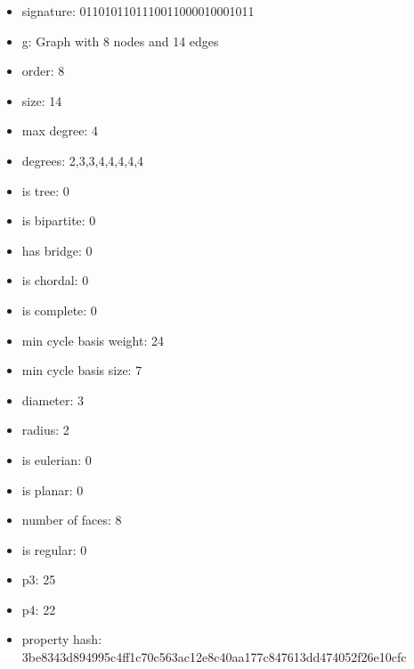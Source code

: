 \begin{itemize}
\item signature: 0110101101110011000010001011
\item g: Graph with 8 nodes and 14 edges
\item order: 8
\item size: 14
\item max degree: 4
\item degrees: 2,3,3,4,4,4,4,4
\item is tree: 0
\item is bipartite: 0
\item has bridge: 0
\item is chordal: 0
\item is complete: 0
\item min cycle basis weight: 24
\item min cycle basis size: 7
\item diameter: 3
\item radius: 2
\item is eulerian: 0
\item is planar: 0
\item number of faces: 8
\item is regular: 0
\item p3: 25
\item p4: 22
\item property hash: 3be8343d894995c4ff1c70c563ac12e8c40aa177c847613dd474052f26e10cfc
\end{itemize}
\newpage
\begin{figure}
\end{figure}
